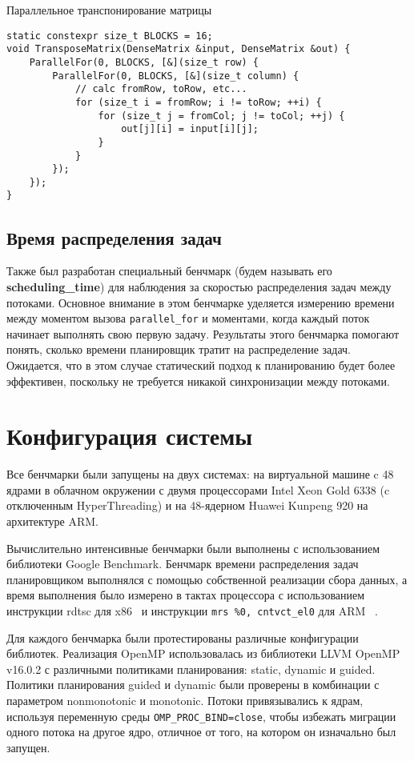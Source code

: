 \documentclass[times,specification,annotation]{itmo-student-thesis}
\begin{document}
\begin{algorithm}[!h]
\caption{Параллельное транспонирование матрицы}\label{lstmtranspose}
\begin{lstlisting}
static constexpr size_t BLOCKS = 16;
void TransposeMatrix(DenseMatrix &input, DenseMatrix &out) {
    ParallelFor(0, BLOCKS, [&](size_t row) {
        ParallelFor(0, BLOCKS, [&](size_t column) {
            // calc fromRow, toRow, etc...
            for (size_t i = fromRow; i != toRow; ++i) {
                for (size_t j = fromCol; j != toCol; ++j) {
                    out[j][i] = input[i][j];
                }
            }
        });
    });
}
\end{lstlisting}
\end{algorithm}


\subsection{Время распределения задач}
Также был разработан специальный бенчмарк (будем называть его \textbf{scheduling\_time}) для наблюдения за скоростью распределения задач между потоками. Основное внимание в этом бенчмарке уделяется измерению времени между моментом вызова \texttt{parallel\_for} и моментами, когда каждый поток начинает выполнять свою первую задачу. Результаты этого бенчмарка помогают понять, сколько времени планировщик тратит на распределение задач. Ожидается, что в этом случае статический подход к планированию будет более эффективен, поскольку не требуется никакой синхронизации между потоками.

\section{Конфигурация системы}
Все бенчмарки были запущены на двух системах: на виртуальной машине c 48 ядрами в облачном окружении с двумя процессорами Intel Xeon Gold 6338 (c отключенным HyperThreading) и на 48-ядерном Huawei Kunpeng 920 на архитектуре ARM.

Вычислительно интенсивные бенчмарки были выполнены с использованием библиотеки Google Benchmark. Бенчмарк времени распределения задач планировщиком выполнялся с помощью собственной реализации сбора данных, а время выполнения было измерено в тактах процессора с использованием инструкции rdtsc для x86~\cite{rdtsc} и инструкции \texttt{mrs \%0, cntvct\_el0} для ARM ~\cite{rdtsc-arm}.

Для каждого бенчмарка были протестированы различные конфигурации библиотек. Реализация OpenMP использовалась из библиотеки LLVM OpenMP v16.0.2 с различными политиками планирования: static, dynamic и guided. Политики планирования guided и dynamic были проверены в комбинации с параметром nonmonotonic и monotonic.
Потоки привязывались к ядрам, используя переменную среды \texttt{OMP\_PROC\_BIND=close}, чтобы избежать миграции одного потока на другое ядро, отличное от того, на котором он изначально был запущен.
\end{document}
